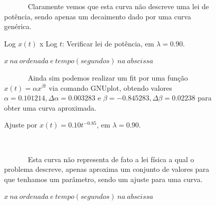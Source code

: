 \documentclass[pdftex,12pt,a4paper]{article}
\begin{document}
\begin{figure}
~~~~~~ Claramente vemos que esta curva não descreve uma lei de potência, sendo apenas um decaimento dado por uma curva genérica.

\centering
\caption{Log $x(t)$ x Log $t$: Verificar lei de potência, em $\lambda = 0.90$.}
\caption*{$x\ na\ ordenada\ e\ tempo(segundos)\ na\ abscissa$}
\end{figure}

\begin{figure}
~~~~~~ Ainda sim podemos realizar um fit por uma função $x(t) = \alpha x^{\beta t}$ via comando GNUplot, obtendo valores $\alpha = 0.101214, \Delta \alpha = 0.003283$ e $\beta = -0.845283, \Delta \beta = 0.02238$ para obter uma curva aproximada.\

\centering
\caption{Ajuste por $x(t) = 0.10t^{-0.85}$, em $\lambda = 0.90$.}
\caption*{$x\ na\ ordenada\ e\ tempo(segundos)\ na\ abscissa$}\ 

~~~~~~ Esta curva não representa de fato a lei física a qual o problema descreve, apenas aproxima um conjunto de valores para que tenhamos um parâmetro, sendo um ajuste para uma curva.
\end{figure}
\end{document}
